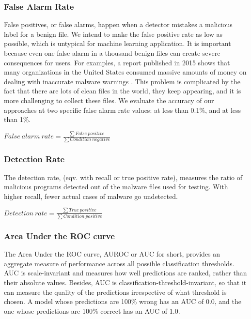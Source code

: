 \documentclass[runningheads]{llncs}
\begin{document}
\subsubsection{False Alarm Rate}

False positives, or false alarms, happen when a detector mistakes a malicious label for a benign file. We intend to make the false positive rate as low as possible, which is untypical for machine learning application. It is important because even one false alarm in a thousand benign files can create severe consequences for users. For examples, a report published in 2015 shows that many organizations in the United States consumed massive amounts of money on dealing with inaccurate malware warnings \cite{eduard2015false}. This problem is complicated by the fact that there are lots of clean files in the world, they keep appearing, and it is more challenging to collect these files. We evaluate the accuracy of our approaches at two specific false alarm rate values: at less than 0.1\%, and at less than 1\%.

\begin{center}
    ${False\ alarm\ rate} =  \frac{\sum False\ positive}{\sum Condition\ negative}$
\end{center}

\subsubsection{Detection Rate}

The detection rate, (eqv. with recall or true positive rate), measures the ratio of malicious programs detected out of the malware files used for testing. With higher recall, fewer actual cases of malware go undetected.

\begin{center}
    ${Detection\ rate} =  \frac{\sum True\ positive}{\sum Condition\ positive}$
\end{center}

\subsubsection{Area Under the ROC curve}

The Area Under the ROC curve, AUROC or AUC for short, provides an aggregate measure of performance across all possible classification thresholds. AUC is scale-invariant and measures how well predictions are ranked, rather than their absolute values. Besides, AUC is classification-threshold-invariant, so that it can measure the quality of the predictions irrespective of what threshold is chosen. A model whose predictions are 100\% wrong has an AUC of 0.0, and the one whose predictions are 100\% correct has an AUC of 1.0.
\end{document}
